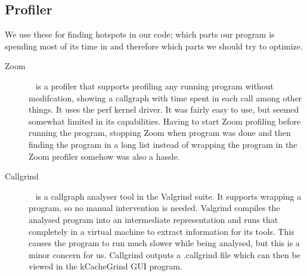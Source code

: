\subsection{Profiler}
We use these for finding hotspots in our code; which parts our program is spending most of its time in and therefore which parts we should try to optimize.

\begin{description}
\item[Zoom]~\citep{zoomprofiler} is a profiler that supports profiling any running program without modifcation, showing a callgraph with time spent in each call among other things.
It uses the perf kernel driver. It was fairly easy to use, but seemed somewhat limited in its capabilities.
Having to start Zoom profiling before running the program, stopping Zoom when program was done and then finding the program in a long list instead of wrapping the program in the Zoom profiler somehow was also a hassle.
\item[Callgrind]~\citep{callgrind} is a callgraph analyser tool in the Valgrind suite.
It supports wrapping a program, so no manual intervention is needed.
Valgrind compiles the analysed program into an intermediate representation and runs that completely in a virtual machine to extract information for its tools.
This causes the program to run much slower while being analysed, but this is a minor concern for us.
Callgrind outputs a .callgrind file which can then be viewed in the kCacheGrind GUI program.
\end{description}